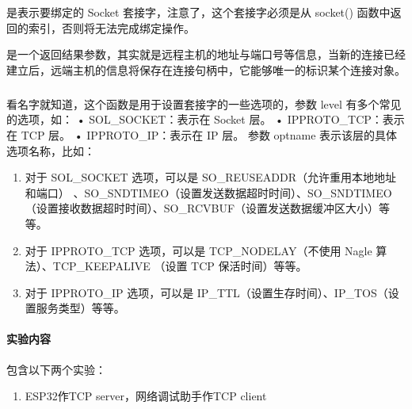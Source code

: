 \documentclass[a4paper,12pt,english]{sphinxmanual}
\begin{document}
{{\sphinxAtStartPar
{} 是表示要绑定的 Socket 套接字，注意了，这个套接字必须是从 socket() 函数中返回的索引，否则将无法完成绑定操作。

\sphinxAtStartPar
{} 是一个返回结果参数，其实就是远程主机的地址与端口号等信息，当新的连接已经建立后，远端主机的信息将保存在连接句柄中，它能够唯一的标识某个连接对象。


\subparagraph{}
\label{\detokenize{exp-esp32/socket/tcp:setsockopt}}
\sphinxAtStartPar
看名字就知道，这个函数是用于设置套接字的一些选项的，参数 level 有多个常见的选项，如：
• SOL\_SOCKET：表示在 Socket 层。
• IPPROTO\_TCP：表示在 TCP 层。
• IPPROTO\_IP：表示在 IP 层。
参数 optname 表示该层的具体选项名称，比如：
\begin{enumerate}
%
\item {} 
\sphinxAtStartPar
对于 SOL\_SOCKET 选项，可以是 SO\_REUSEADDR（允许重用本地地址和端口） 、SO\_SNDTIMEO（设置发送数据超时时间）、SO\_SNDTIMEO（设置接收数据超时时间）、SO\_RCVBUF（设置发送数据缓冲区大小）等等。

\item {} 
\sphinxAtStartPar
对于 IPPROTO\_TCP 选项，可以是 TCP\_NODELAY（不使用 Nagle 算法）、TCP\_KEEPALIVE
（设置 TCP 保活时间）等等。

\item {} 
\sphinxAtStartPar
对于 IPPROTO\_IP 选项，可以是 IP\_TTL（设置生存时间）、IP\_TOS（设置服务类型）等等。

\end{enumerate}

\begin{sphinxVerbatim}[commandchars=\\\{\}]
\end{sphinxVerbatim}


\paragraph{实验内容}
\label{\detokenize{exp-esp32/socket/tcp:id1}}
\sphinxAtStartPar
包含以下两个实验：
\begin{enumerate}
%
\item {} 
\sphinxAtStartPar
ESP32作TCP server，网络调试助手作TCP client


\end{enumerate}}}
\end{document}
